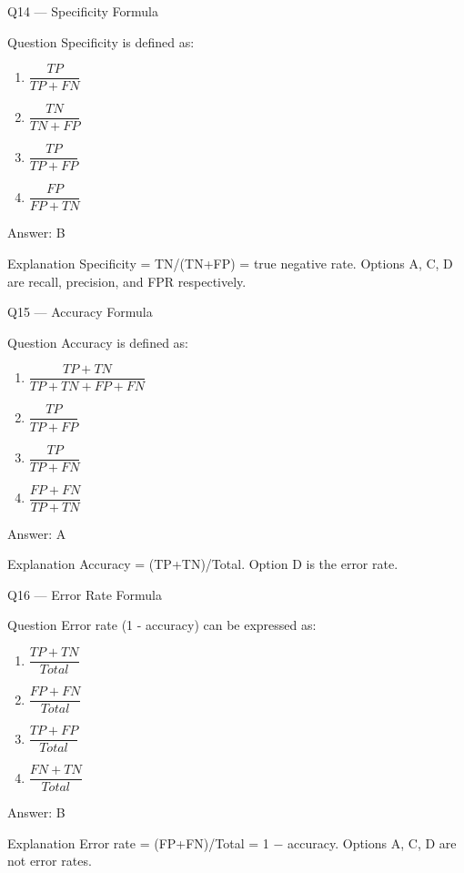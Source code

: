 \documentclass[aspectratio=169,8pt]{beamer}
\begin{document}
	\begin{frame}{Q14 --- Specificity Formula}
		\begin{block}{Question}
			Specificity is defined as:
			\begin{enumerate}
				\item $\dfrac{TP}{TP + FN}$
				\item $\dfrac{TN}{TN + FP}$
				\item $\dfrac{TP}{TP + FP}$
				\item $\dfrac{FP}{FP + TN}$
			\end{enumerate}
		\end{block}
		\begin{exampleblock}{Answer: B}\end{exampleblock}
		\begin{block}{Explanation}
			Specificity = TN/(TN+FP) = true negative rate. Options A, C, D are recall, precision, and FPR respectively.
		\end{block}
	\end{frame}
	
	\begin{frame}{Q15 --- Accuracy Formula}
		\begin{block}{Question}
			Accuracy is defined as:
			\begin{enumerate}
				\item $\dfrac{TP + TN}{TP + TN + FP + FN}$
				\item $\dfrac{TP}{TP + FP}$
				\item $\dfrac{TP}{TP + FN}$
				\item $\dfrac{FP + FN}{TP + TN}$
			\end{enumerate}
		\end{block}
		\begin{exampleblock}{Answer: A}\end{exampleblock}
		\begin{block}{Explanation}
			Accuracy = (TP+TN)/Total. Option D is the error rate.
		\end{block}
	\end{frame}
	
	\begin{frame}{Q16 --- Error Rate Formula}
		\begin{block}{Question}
			Error rate (1 - accuracy) can be expressed as:
			\begin{enumerate}
				\item $\dfrac{TP + TN}{Total}$
				\item $\dfrac{FP + FN}{Total}$
				\item $\dfrac{TP + FP}{Total}$
				\item $\dfrac{FN + TN}{Total}$
			\end{enumerate}
		\end{block}
		\begin{exampleblock}{Answer: B}\end{exampleblock}
		\begin{block}{Explanation}
			Error rate = (FP+FN)/Total = 1 $-$ accuracy. Options A, C, D are not error rates.
		\end{block}
	\end{frame}
	
\end{document}
